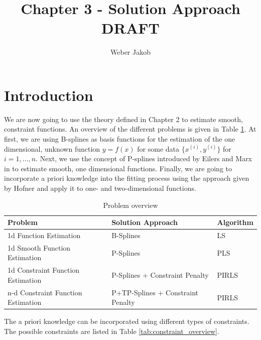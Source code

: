 \documentclass[10pt,a4paper]{article}
\title{Chapter 3 - Solution Approach DRAFT}
\author{Weber Jakob}
\begin{document}
	\maketitle
	
	\tableofcontents
	\section{Introduction}
	
	We are now going to use the theory defined in Chapter 2 to estimate smooth, constraint functions. An overview of the different problems is given in Table \ref{tab:problem_overview}. At first, we are using B-splines as basis functions for the estimation of the one dimensional, unknown function $y = f(x)$ for some data $\{x^{(i)}, y^{(i)}\}$ for $i = 1, \dots, n$.  Next, we use the concept of P-splines introduced by Eilers and Marx in \cite{eilers1996flexible} to estimate smooth, one dimensional functions. Finally, we are going to incorporate a priori knowledge into the fitting process using the approach given by Hofner and apply it to one- and two-dimensional functions. \cite{hofner2011monotonicity} 

	\begin{table}[H]
	\centering
	\begin{tabular}{|lll|}
		\hline
		\textbf{Problem}                   & \textbf{Solution Approach}           & \textbf{Algorithm}  \\ \hline \toprule
		1d Function Estimation             & B-Splines                            & LS                  \\ \hline
		1d Smooth Function Estimation      & P-Splines                            & PLS                 \\ \hline
		1d Constraint Function Estimation  & P-Splines + Constraint Penalty       & PIRLS 			    \\ \hline 
		n-d Constraint Function Estimation & P+TP-Splines + Constraint Penalty & PIRLS 			    \\ \hline \bottomrule
	\end{tabular}
	\caption{Problem overview}
	\label{tab:problem_overview}
	\end{table}

	The a priori knowledge can be incorporated using different types of constraints. The possible constraints are listed in Table \ref{tab:constraint_overview}.
	
\end{document}
